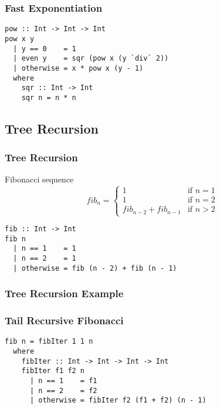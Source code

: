 \documentclass[dvipsnames]{beamer}
\theoremstyle{plain}
\begin{document}
\begin{frame}[fragile]
  \frametitle{Fast Exponentiation}

  \begin{lstlisting}
pow :: Int -> Int -> Int
pow x y
  | y == 0    = 1
  | even y    = sqr (pow x (y `div` 2))
  | otherwise = x * pow x (y - 1)
  where
    sqr :: Int -> Int
    sqr n = n * n
  \end{lstlisting}
\end{frame}

\subsection{Tree Recursion}

\begin{frame}[fragile]
  \frametitle{Tree Recursion}

  \begin{exampleblock}{Fibonacci sequence}
    \[
      fib_n =
        \begin{cases}
          1                     & \mbox{if } n = 1\\
          1                     & \mbox{if } n = 2\\
          fib_{n-2} + fib_{n-1} & \mbox{if } n > 2
        \end{cases}
    \]

    \begin{lstlisting}
fib :: Int -> Int
fib n
  | n == 1    = 1
  | n == 2    = 1
  | otherwise = fib (n - 2) + fib (n - 1)
    \end{lstlisting}
  \end{exampleblock}
\end{frame}

\begin{frame}[fragile]
  \frametitle{Tree Recursion Example}

  \begin{center}
  \end{center}
\end{frame}

\begin{frame}[fragile]
  \frametitle{Tail Recursive Fibonacci}

  \begin{exampleblock}{}
    \begin{lstlisting}
fib n = fibIter 1 1 n
  where
    fibIter :: Int -> Int -> Int -> Int
    fibIter f1 f2 n
      | n == 1    = f1
      | n == 2    = f2
      | otherwise = fibIter f2 (f1 + f2) (n - 1)
    \end{lstlisting}
  \end{exampleblock}
\end{frame}
\end{document}
